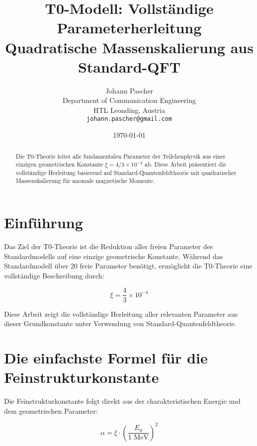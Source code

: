 \documentclass[12pt,a4paper]{article}
\begin{document}
	
	\title{T0-Modell: Vollständige Parameterherleitung \\
		\large Quadratische Massenskalierung aus Standard-QFT}
	\author{Johann Pascher\\
		Department of Communication Engineering\\
		HTL Leonding, Austria\\
		\texttt{johann.pascher@gmail.com}}
	\date{\today}
	
	\maketitle
	
	\begin{abstract}
		Die T0-Theorie leitet alle fundamentalen Parameter der Teilchenphysik aus einer einzigen geometrischen Konstante $\xi = 4/3 \times 10^{-4}$ ab. Diese Arbeit präsentiert die vollständige Herleitung basierend auf Standard-Quantenfeldtheorie mit quadratischer Massenskalierung für anomale magnetische Momente.
	\end{abstract}
	
	\tableofcontents
	\newpage
	
	\section{Einführung}
	
	Das Ziel der T0-Theorie ist die Reduktion aller freien Parameter des Standardmodells auf eine einzige geometrische Konstante. Während das Standardmodell über 20 freie Parameter benötigt, ermöglicht die T0-Theorie eine vollständige Beschreibung durch:
	
	\begin{equation}
		\boxed{\xi = \frac{4}{3} \times 10^{-4}}
	\end{equation}
	
	Diese Arbeit zeigt die vollständige Herleitung aller relevanten Parameter aus dieser Grundkonstante unter Verwendung von Standard-Quantenfeldtheorie.
	
	\section{Die einfachste Formel für die Feinstrukturkonstante}
	
	Die Feinstrukturkonstante folgt direkt aus der charakteristischen Energie und dem geometrischen Parameter:
	
	\begin{equation}
		\boxed{\alpha = \xi \cdot \left(\frac{E_0}{1 \text{ MeV}}\right)^2}
	\end{equation}
	
\end{document}

